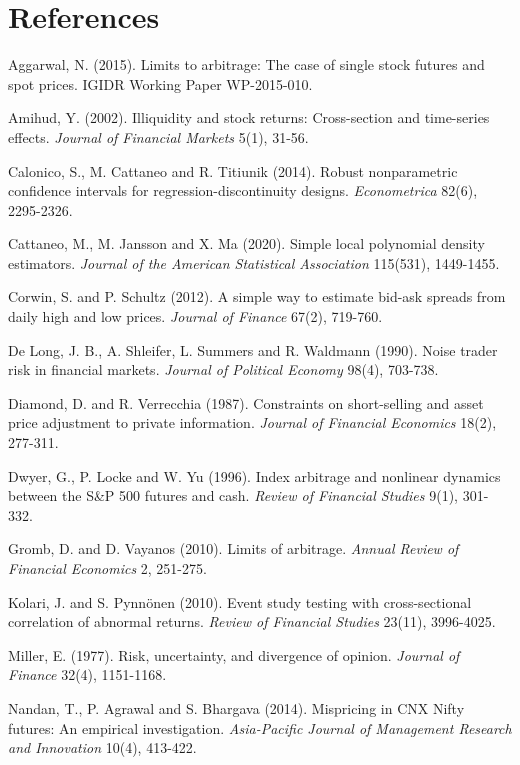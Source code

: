 \section*{References}
\small
\begin{description}[leftmargin=1.2em,itemsep=1pt,font=\normalfont]
\item Aggarwal, N. (2015). Limits to arbitrage: The case of single stock futures and spot prices. IGIDR Working Paper WP-2015-010.
\item Amihud, Y. (2002). Illiquidity and stock returns: Cross-section and time-series effects. \emph{Journal of Financial Markets} 5(1), 31-56.
\item Calonico, S., M. Cattaneo and R. Titiunik (2014). Robust nonparametric confidence intervals for regression-discontinuity designs. \emph{Econometrica} 82(6), 2295-2326.
\item Cattaneo, M., M. Jansson and X. Ma (2020). Simple local polynomial density estimators. \emph{Journal of the American Statistical Association} 115(531), 1449-1455.
\item Corwin, S. and P. Schultz (2012). A simple way to estimate bid-ask spreads from daily high and low prices. \emph{Journal of Finance} 67(2), 719-760.
\item De Long, J. B., A. Shleifer, L. Summers and R. Waldmann (1990). Noise trader risk in financial markets. \emph{Journal of Political Economy} 98(4), 703-738.
\item Diamond, D. and R. Verrecchia (1987). Constraints on short-selling and asset price adjustment to private information. \emph{Journal of Financial Economics} 18(2), 277-311.
\item Dwyer, G., P. Locke and W. Yu (1996). Index arbitrage and nonlinear dynamics between the S\&P 500 futures and cash. \emph{Review of Financial Studies} 9(1), 301-332.
\item Gromb, D. and D. Vayanos (2010). Limits of arbitrage. \emph{Annual Review of Financial Economics} 2, 251-275.
\item Kolari, J. and S. Pynn\"onen (2010). Event study testing with cross-sectional correlation of abnormal returns. \emph{Review of Financial Studies} 23(11), 3996-4025.
\item Miller, E. (1977). Risk, uncertainty, and divergence of opinion. \emph{Journal of Finance} 32(4), 1151-1168.
\item Nandan, T., P. Agrawal and S. Bhargava (2014). Mispricing in CNX Nifty futures: An empirical investigation. \emph{Asia-Pacific Journal of Management Research and Innovation} 10(4), 413-422.

\end{description}

